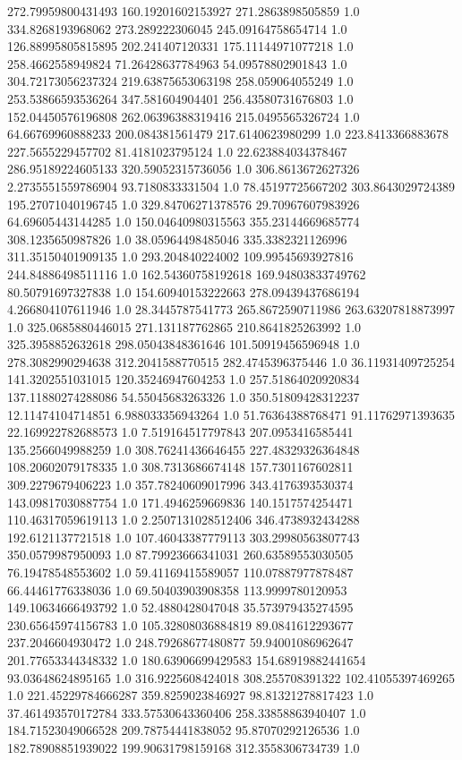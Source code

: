 272.79959800431493	160.19201602153927	271.2863898505859	1.0
334.8268193968062	273.289222306045	245.09164758654714	1.0
126.88995805815895	202.241407120331	175.11144971077218	1.0
258.4662558949824	71.26428637784963	54.09578802901843	1.0
304.72173056237324	219.63875653063198	258.059064055249	1.0
253.53866593536264	347.581604904401	256.43580731676803	1.0
152.04450576196808	262.06396388319416	215.0495565326724	1.0
64.66769960888233	200.084381561479	217.6140623980299	1.0
223.8413366883678	227.5655229457702	81.4181023795124	1.0
22.623884034378467	286.95189224605133	320.59052315736056	1.0
306.8613672627326	2.2735551559786904	93.7180833331504	1.0
78.45197725667202	303.8643029724389	195.27071040196745	1.0
329.84706271378576	29.70967607983926	64.69605443144285	1.0
150.04640980315563	355.23144669685774	308.1235650987826	1.0
38.05964498485046	335.3382321126996	311.35150401909135	1.0
293.204840224002	109.99545693927816	244.84886498511116	1.0
162.54360758192618	169.94803833749762	80.50791697327838	1.0
154.60940153222663	278.09439437686194	4.266804107611946	1.0
28.3445787541773	265.8672590711986	263.63207818873997	1.0
325.0685880446015	271.131187762865	210.8641825263992	1.0
325.3958852632618	298.05043848361646	101.50919456596948	1.0
278.3082990294638	312.2041588770515	282.4745396375446	1.0
36.11931409725254	141.3202551031015	120.35246947604253	1.0
257.51864020920834	137.11880274288086	54.55045683263326	1.0
350.51809428312237	12.11474104714851	6.988033356943264	1.0
51.76364388768471	91.11762971393635	22.169922782688573	1.0
7.519164517797843	207.0953416585441	135.2566049988259	1.0
308.76241436646455	227.48329326364848	108.20602079178335	1.0
308.7313686674148	157.7301167602811	309.2279679406223	1.0
357.78240609017996	343.4176393530374	143.09817030887754	1.0
171.4946259669836	140.1517574254471	110.46317059619113	1.0
2.2507131028512406	346.4738932434288	192.6121137721518	1.0
107.46043387779113	303.29980563807743	350.0579987950093	1.0
87.79923666341031	260.63589553030505	76.19478548553602	1.0
59.41169415589057	110.07887977878487	66.44461776338036	1.0
69.50403903908358	113.9999780120953	149.10634666493792	1.0
52.4880428047048	35.573979435274595	230.65645974156783	1.0
105.32808036884819	89.0841612293677	237.2046604930472	1.0
248.79268677480877	59.94001086962647	201.77653344348332	1.0
180.63906699429583	154.68919882441654	93.03648624895165	1.0
316.9225608424018	308.255708391322	102.41055397469265	1.0
221.45229784666287	359.8259023846927	98.81321278817423	1.0
37.461493570172784	333.57530643360406	258.33858863940407	1.0
184.71523049066528	209.78754441838052	95.87070292126536	1.0
182.78908851939022	199.90631798159168	312.3558306734739	1.0
